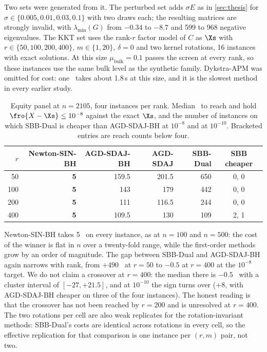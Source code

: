 Two sets were generated from it. The perturbed set adds
$\sigma E$ as in \cref{sec:thesis} for $\sigma\in\{0.005,0.01,0.03,0.1\}$ with
two draws each; the resulting matrices are strongly invalid, with
$\lambda_{\min}(G)$ from $-0.34$ to $-8.7$ and 599 to 968 negative eigenvalues.
The KKT set uses the rank-$r$ factor model of $C$ as $\Xs$ with
$r\in\{50,100,200,400\}$, $m\in\{1,20\}$, $\delta=0$ and two kernel rotations,
16 instances with exact solutions. At this size $\mu_{\mathrm{bulk}}=0.1$
passes the screen at every rank, so these instances use the same bulk level as
the synthetic family. Dykstra-APM was omitted for cost: one \EVD\ takes about
1.8\,s at this size, and it is the slowest method in every earlier study.

\begin{table}[t]
\centering
\caption{Equity panel at $n=2105$, four instances per rank. Median \EVDs\ to
reach and hold $\fro{X-\Xs}\le10^{-8}$ against the exact $\Xs$, and the number
of instances on which SBB-Dual is cheaper than AGD-SDAJ-BH at $10^{-8}$ and at
$10^{-10}$. Bracketed entries are reach counts below four.}
\label{tab:us2105}
\small
\begin{tabular}{rrrrrc}
\toprule
$r$ & Newton-SIN-BH & AGD-SDAJ-BH & AGD-SDAJ & SBB-Dual & SBB cheaper\\
\midrule
50  & \textbf{5} & 159.5 & 201.5 & 650 & 0, 0\\
100 & \textbf{5} & 143   & 179   & 442 & 0, 0\\
200 & \textbf{5} & 111   & 116.5 & 244 & 0, 0\\
400 & \textbf{5} & 109.5 & 130   & 109 & 2, 1\\
\bottomrule
\end{tabular}
\end{table}

Newton-SIN-BH takes 5 \EVDs\ on every instance, as at $n=100$ and $n=500$: the
cost of the winner is flat in $n$ over a twenty-fold range, while the
first-order methods grow by an order of magnitude. The gap between SBB-Dual and
AGD-SDAJ-BH again narrows with rank, from $+490$ \EVDs\ at $r=50$ to $-0.5$ at
$r=400$ at the $10^{-8}$ target. We do not claim a crossover at $r=400$: the
median there is $-0.5$ \EVDs\ with a cluster interval of $[-27,+21.5]$, and at
$10^{-10}$ the sign turns over ($+8$, with AGD-SDAJ-BH cheaper on three of the
four instances). The honest reading is that the crossover has not been reached
by $r=200$ and is unresolved at $r=400$. The two rotations per cell are also
weak replicates for the rotation-invariant methods: SBB-Dual's costs are
identical across rotations in every cell, so the effective replication for that
comparison is one instance per $(r,m)$ pair, not two.

